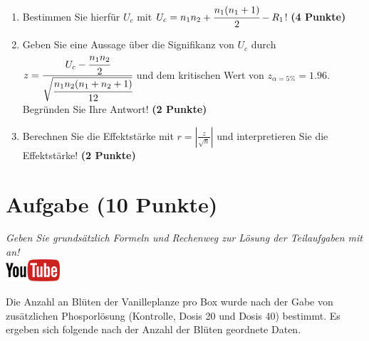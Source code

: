 \documentclass[a4paper, 10pt]{scrartcl}\usepackage[]{graphicx}\usepackage[]{xcolor}
\begin{document}
\begin{enumerate}
\item Bestimmen Sie hierf{\"u}r $U_c$ mit $U_c = n_1n_2 +
  \cfrac{n_1(n_1+1)}{2}-R_1$! \textbf{(4 Punkte)} 
\item Geben Sie eine Aussage {\"u}ber die Signifikanz von $U_c$ durch
  $z = \cfrac{U_c -
    \cfrac{n_1n_2}{2}}{\sqrt{\cfrac{n_1n_2(n_1+n_2+1)}{12}}}$ und dem
  kritischen Wert von $z_{\alpha = 5\%} = 1.96$. Begr{\"u}nden Sie Ihre
  Antwort! \textbf{(2 Punkte)}
\item Berechnen Sie die Effektst{\"a}rke mit $r = |\frac{z}{\sqrt{n}}| $ und
  interpretieren Sie die Effektst{\"a}rke! \textbf{(2 Punkte)} 
\end{enumerate} 
\clearpage

\section{Aufgabe \hfill (10 Punkte)}

\textit{Geben Sie grunds{\"a}tzlich Formeln und Rechenweg zur L{\"o}sung der
  Teilaufgaben mit an!} \\[1Ex]

\hfill\href{https://youtu.be/gC0SXiIG2wQ}{\includegraphics[width =
  2cm]{img/youtube}} %
\hspace{2Ex}




Die Anzahl an Bl{\"u}ten der Vanilleplanze pro Box wurde nach der Gabe von
zus{\"a}tzlichen Phosporl{\"o}sung (Kontrolle, Dosis 20 und Dosis 40) bestimmt. Es
ergeben sich folgende nach der Anzahl der Bl{\"u}ten geordnete Daten.
\end{document}
